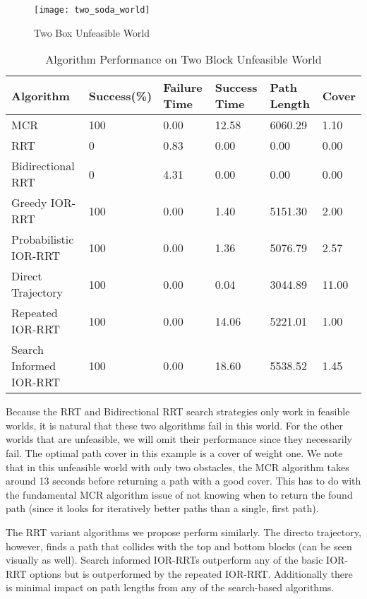 \begin{figure}[h!]
    \centering
    \texttt{[image: two\_soda\_world]}
    \caption{Two Box Unfeasible World}
    \label{fig:two_soda_world}
\end{figure}

\begin{table}[h!]
\centering
\begin{tabular}{@{}llllll@{}}
\toprule
Algorithm & Success(\%)  & Failure Time  & Success Time  & Path Length & Cover\\ 
\midrule
MCR & 100 & 0.00 & 12.58 & 6060.29 & 1.10 \\
RRT & 0 & 0.83 & 0.00 & 0.00 & 0.00 \\
Bidirectional RRT & 0 & 4.31 & 0.00 & 0.00 & 0.00 \\
Greedy IOR-RRT & 100 & 0.00 & 1.40 & 5151.30 & 2.00 \\
Probabilistic IOR-RRT & 100 & 0.00 & 1.36 & 5076.79 & 2.57 \\
Direct Trajectory & 100 & 0.00 & 0.04 & 3044.89 & 11.00 \\
Repeated IOR-RRT & 100 & 0.00 & 14.06 & 5221.01 & 1.00 \\
Search Informed IOR-RRT & 100 & 0.00 & 18.60 & 5538.52 & 1.45 \\
\bottomrule
\end{tabular}
\caption{Algorithm Performance on Two Block Unfeasible World}
\label{tab:two_soda_world}
\end{table}

Because the RRT and Bidirectional RRT search strategies only work in feasible worlds, it is natural that these two algorithms fail in this world. For the other worlds that are unfeasible, we will omit their performance since they necessarily fail. The optimal path cover in this example is a cover of weight one.  We note that in this unfeasible world with only two obstacles, the MCR algorithm takes around 13 seconds before returning a path with a good cover. This has to do with the fundamental MCR algorithm issue of not knowing when to return the found path (since it looks for iteratively better paths than a single, first path). 

The RRT variant algorithms we propose perform similarly. The directo trajectory, however, finds a path that collides with the top and bottom blocks (can be seen visually as well). Search informed IOR-RRTs outperform any of the basic IOR-RRT options but is outperformed by the repeated IOR-RRT. Additionally there is minimal impact on path lengths from any of the search-based algorithms.

